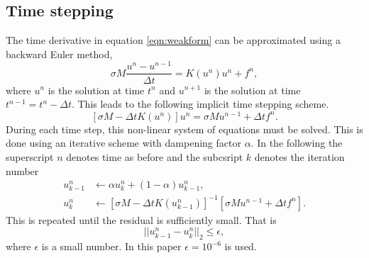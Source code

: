 \subsection{Time stepping}
The time derivative in equation \ref{eqn:weakform} can be approximated using a backward Euler method, 
\begin{equation}
    \sigma M\frac{u^{n} - u^{n-1}}{\Delta t} = K(u^{n}) u^{n} + f^{n},
\end{equation}
where $u^n$ is the solution at time $t^n$ and $u^{n+1}$ is the solution at time $t^{n-1} = t^n - \Delta t$.
This leads to the following implicit time stepping scheme.
\begin{equation}
    \left[\sigma M - \Delta t K(u^{n})\right]u^{n} = \sigma M u^{n-1} + \Delta t f^{n}.
\end{equation}
During each time step, this non-linear system of equations must be solved. This is done using an iterative scheme with dampening factor $\alpha$. In the following
the superscript $n$ denotes time as before and the subcsript $k$ denotes the iteration number
\begin{align*}
    u^n_{k-1} &\leftarrow \alpha u^n_k + (1-\alpha)u^n_{k-1},\\
    u^n_{k} &\leftarrow \left[\sigma M - \Delta t K(u^n_{k-1})\right]^{-1}\left[\sigma M u^{n-1} + \Delta t f^{n}\right].
\end{align*}
This is repeated until the residual is sufficiently small. That is
\begin{equation*}
    ||u^n_{k-1} - u^{n}_k||_2 \leq \epsilon,
\end{equation*}
where $\epsilon$ is a small number. In this paper $\epsilon = 10^{-6}$ is used.